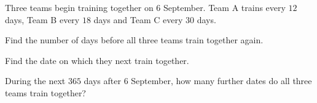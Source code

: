  Three teams begin training together on 6 September. Team A trains every $12$ days, Team B every $18$ days and Team C every $30$ days.
\begin{subparts}
  \item Find the number of days before all three teams train together again.
  \item Find the date on which they next train together.
  \item During the next $365$ days after 6 September, how many further dates do all three teams train together?
\end{subparts}
